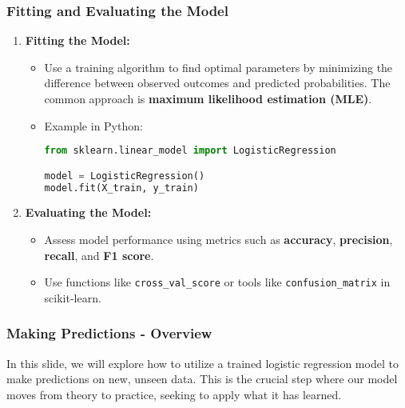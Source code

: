 \documentclass[aspectratio=169]{beamer}
\begin{document}
\begin{frame}[fragile]
    \frametitle{Fitting and Evaluating the Model}
    \begin{enumerate}[resume]
        \item \textbf{Fitting the Model:}
            \begin{itemize}
                \item Use a training algorithm to find optimal parameters by minimizing the difference between observed outcomes and predicted probabilities. The common approach is \textbf{maximum likelihood estimation (MLE)}.
                \item Example in Python:
                \begin{lstlisting}[language=Python]
from sklearn.linear_model import LogisticRegression

model = LogisticRegression()
model.fit(X_train, y_train)
                \end{lstlisting}
            \end{itemize}

        \item \textbf{Evaluating the Model:}
            \begin{itemize}
                \item Assess model performance using metrics such as \textbf{accuracy}, \textbf{precision}, \textbf{recall}, and \textbf{F1 score}.
                \item Use functions like \texttt{cross\_val\_score} or tools like \texttt{confusion\_matrix} in scikit-learn.
            \end{itemize}
    \end{enumerate}
\end{frame}

\begin{frame}[fragile]
  \frametitle{Making Predictions - Overview}
  In this slide, we will explore how to utilize a trained logistic regression model to make predictions on new, unseen data. 
  This is the crucial step where our model moves from theory to practice, seeking to apply what it has learned.
\end{frame}
\end{document}

